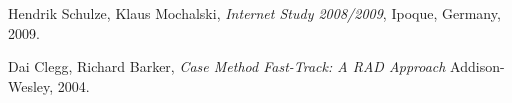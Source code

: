 \documentclass[pdftex, 10pt, a4paper]{report}
\begin{document}
\pagestyle{fancy}
\fancyhead{}
\fancyhead[LE, LO] {\today}



\tableofcontents


\begin{thebibliography}{9}

  Hendrik Schulze, Klaus Mochalski,
  \emph{Internet Study 2008/2009},
  Ipoque, Germany,
  2009.

	Dai Clegg, Richard Barker,  
	\emph{Case Method Fast-Track: A RAD Approach}
	Addison-Wesley,
	2004.

\end{thebibliography}
\begin{appendices}
\end{appendices}
\end{document}
